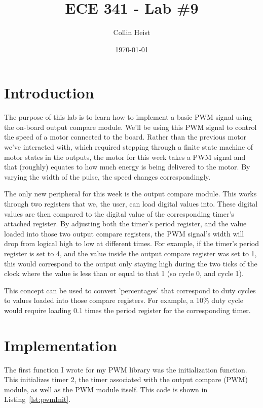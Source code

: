 \documentclass[a4paper, 12pt]{article}
\begin{document}
\title{ECE 341 - Lab \#9}
\author{Collin Heist}
\date{\today}
\maketitle
{}
\tableofcontents
\lstlistoflistings
\newpage
{}

\section{Introduction}
The purpose of this lab is to learn how to implement a basic PWM signal using the on-board output compare module. We'll be using this PWM signal to control the speed of a motor connected to the board. Rather than the previous  motor we've interacted with, which required stepping through a finite state machine of motor states in the outputs, the motor for this week takes a PWM signal and that (roughly) equates to how much energy is being delivered to the motor. By varying the width of the pulse, the speed changes correspondingly. 

The only new peripheral for this week is the output compare module. This works through two registers that we, the user, can load digital values into. These digital values are then compared to the digital value of the corresponding timer's attached register. By adjusting both the timer's period register, and the value loaded into those two output compare registers, the PWM signal's width will drop from logical high to low at different times. For example, if the timer's period register is set to 4, and the value inside the output compare register was set to 1, this would correspond to the output only staying high during the two ticks of the clock where the value is less than or equal to that 1 (so cycle 0, and cycle 1). 

This concept can be used to convert 'percentages' that correspond to duty cycles to values loaded into those compare registers. For example, a 10\% duty cycle would require loading 0.1 times the period register for the corresponding timer.

\section{Implementation}
The first function I wrote for my PWM library was the initialization function. This initializes timer 2, the timer associated with the output compare (PWM) module, as well as the PWM module itself. This code is shown in Listing~\ref{lst:pwmInit}.
\end{document}
